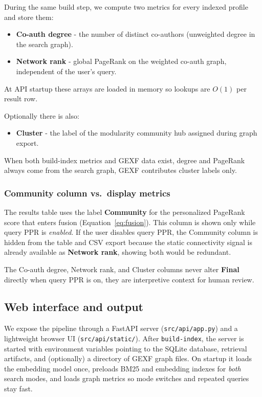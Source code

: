 \documentclass{article}
\begin{document}
During the same build step, we compute two metrics for every indexed profile and store them:
\begin{itemize}[noitemsep]
  \item \textbf{Co-auth degree} - the number of distinct co-authors (unweighted degree in the search graph).
  \item \textbf{Network rank} - global PageRank on the weighted co-auth graph, independent of the user's query.
\end{itemize}
At API startup these arrays are loaded in memory so lookups are $O(1)$ per result row.

Optionally there is also:
\begin{itemize}[noitemsep]
  \item \textbf{Cluster} - the label of the modularity community hub assigned during graph export.
\end{itemize}
When both build-index metrics and GEXF data exist, degree and PageRank always come from the search graph, GEXF contributes cluster labels only.

\subsubsection{Community column vs.\ display metrics}

The results table uses the label \textbf{Community} for the personalized PageRank score that enters fusion (Equation~\eqref{eq:fusion}). This column is shown only while query PPR is \emph{enabled}. If the user disables query PPR, the Community column is hidden from the table and CSV export because the static connectivity signal is already available as \textbf{Network rank}, showing both would be redundant.

The Co-auth degree, Network rank, and Cluster columns never alter \textbf{Final} directly when query PPR is on, they are interpretive context for human review.

\subsection{Web interface and output}

We expose the pipeline through a FastAPI server (\texttt{src/api/app.py}) and a lightweight browser UI (\texttt{src/api/static/}). After \texttt{build-index}, the server is started with environment variables pointing to the SQLite database, retrieval artifacts, and (optionally) a directory of GEXF graph files. On startup it loads the embedding model once, preloads BM25 and embedding indexes for \emph{both} search modes, and loads graph metrics so mode switches and repeated queries stay fast.
\end{document}
